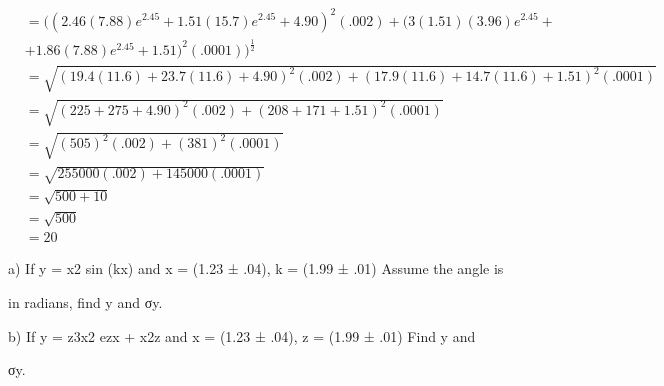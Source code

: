\documentclass{article}
\begin{document}
\begin{enumerate}
\begin{enumerate}
\begin{align*}
&= ((2.46(7.88)e^{2.45} + 1.51(15.7)e^{2.45} + 4.90)^2(.002) + (3(1.51)(3.96)e^{2.45} +\\
&+ 1.86(7.88)e^{2.45} + 1.51)^2(.0001))^{\frac{1}{2}}\\
&= \sqrt{(19.4(11.6) + 23.7(11.6) + 4.90)^2(.002) + (17.9(11.6) + 14.7(11.6) + 1.51)^2(.0001)}\\
&= \sqrt{(225 + 275 + 4.90)^2(.002) + (208 + 171 + 1.51)^2(.0001)}\\
&= \sqrt{(505)^2(.002) + (381)^2(.0001)}\\
&= \sqrt{255000(.002) + 145000(.0001)}\\
&= \sqrt{500 + 10}\\
&= \sqrt{500}\\
&= 20
\end{align*}
\end{enumerate}
\end{enumerate}


a) If y = x2 sin (kx) and x = (1.23 ± .04), k = (1.99 ± .01) Assume the angle is 

in radians, find y and σy. 

b) If y = z3x2 ezx + x2z and x = (1.23 ± .04), z = (1.99 ± .01) Find y and 

σy.
\end{document}
